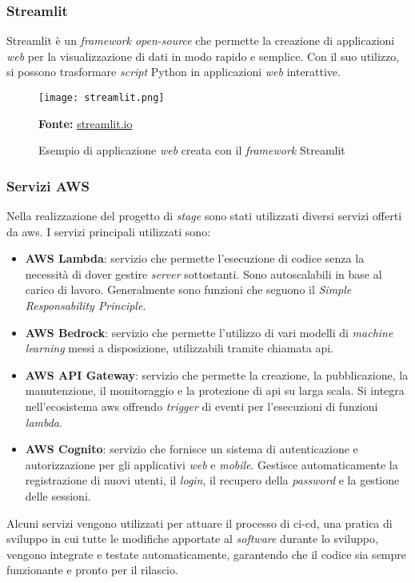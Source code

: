 \subsubsection{Streamlit}
Streamlit è un \textit{framework open-source} che permette la creazione di applicazioni \textit{web} per la visualizzazione di dati in modo rapido e semplice.
Con il suo utilizzo, si possono trasformare \textit{script} Python in applicazioni \textit{web} interattive.
\begin{figure}[H]
    \centering
    \texttt{[image: streamlit.png]}
    \caption{Esempio di applicazione \textit{web} creata con il \textit{framework} Streamlit}
    \small \textbf{Fonte:} \href{https://streamlit.io}{streamlit.io}
    \label{fig:Streamlit}
\end{figure} 

\subsubsection {Servizi AWS}
Nella realizzazione del progetto di \textit{stage} sono stati utilizzati diversi servizi offerti da \gls{aws}. I servizi principali utilizzati sono:
\begin{itemize}
    \item \textbf{AWS Lambda}: servizio che permette l'esecuzione di codice senza la necessità di dover gestire \textit{server} sottostanti. Sono autoscalabili in base al carico di lavoro. Generalmente sono funzioni che seguono il \textit{Simple Responsability Principle}.
    \item \textbf{AWS Bedrock}: servizio che permette l'utilizzo di vari modelli di \textit{machine learning} messi a disposizione, utilizzabili tramite chiamata \gls{api}.
    \item \textbf{AWS API Gateway}: servizio che permette la creazione, la pubblicazione, la manutenzione, il monitoraggio e la protezione di \gls{api} su larga scala. Si integra nell'ecosistema \gls{aws} offrendo \textit{trigger} di eventi per l'esecuzioni di funzioni \textit{lambda}.
    \item \textbf{AWS Cognito}: servizio che fornisce un sistema di autenticazione e autorizzazione per gli applicativi \textit{web} e \textit{mobile}. Gestisce automaticamente la registrazione di nuovi utenti, il \textit{login}, il recupero della \textit{password} e la gestione delle sessioni.
\end{itemize}
Alcuni servizi vengono utilizzati per attuare il processo di \gls{ci-cd}, una pratica di sviluppo in cui tutte le modifiche apportate al \textit{software} durante lo sviluppo, vengono integrate e testate automaticamente, garantendo che il codice sia sempre funzionante e pronto per il rilascio.
